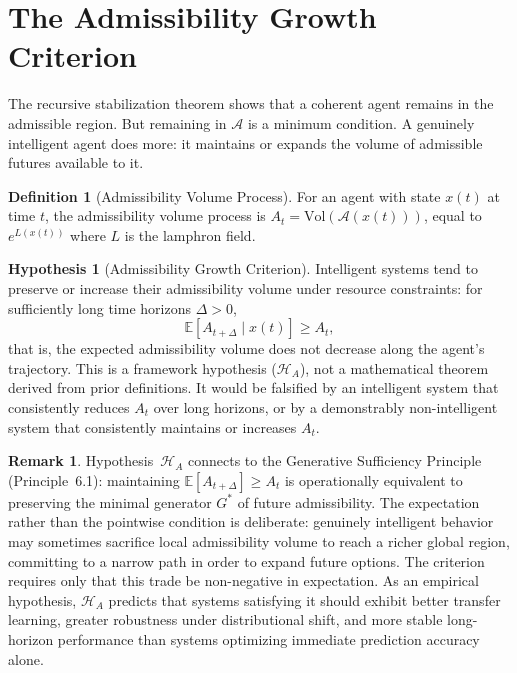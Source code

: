 \documentclass[12pt, oneside]{book}
\theoremstyle{flyxion}
\theoremstyle{definition}
\newtheorem{definition}[theorem]{Definition}
\newtheorem{hypothesis}[theorem]{Hypothesis}
\newtheorem{remark}[theorem]{Remark}
\begin{document}
\section{The Admissibility Growth Criterion}

The recursive stabilization theorem shows that a
coherent agent remains in the admissible region. But
remaining in $\mathcal{A}$ is a minimum condition.
A genuinely intelligent agent does more: it maintains
or expands the volume of admissible futures available
to it.

\begin{definition}[Admissibility Volume Process]
For an agent with state $x(t)$ at time $t$, the
admissibility volume process is $A_t =
\mathrm{Vol}(\mathcal{A}(x(t)))$, equal to $e^{L(x(t))}$
where $L$ is the lamphron field.
\end{definition}

\begin{hypothesis}[Admissibility Growth Criterion]
\label{thm:intelligence_criterion}
Intelligent systems tend to preserve or increase their
admissibility volume under resource constraints: for
sufficiently long time horizons $\Delta > 0$,
\[
\mathbb{E}[A_{t+\Delta} \mid x(t)] \geq A_t,
\]
that is, the expected admissibility volume does not
decrease along the agent's trajectory. This is a
framework hypothesis ($\mathcal{H}_A$), not a
mathematical theorem derived from prior definitions.
It would be falsified by an intelligent system that
consistently reduces $A_t$ over long horizons, or by
a demonstrably non-intelligent system that consistently
maintains or increases $A_t$.
\end{hypothesis}

\begin{remark}
Hypothesis~$\mathcal{H}_A$ connects to the Generative
Sufficiency Principle (Principle~6.1): maintaining
$\mathbb{E}[A_{t+\Delta}] \geq A_t$ is operationally
equivalent to preserving the minimal generator $G^*$
of future admissibility. The expectation rather than
the pointwise condition is deliberate: genuinely
intelligent behavior may sometimes sacrifice local
admissibility volume to reach a richer global region,
committing to a narrow path in order to expand future
options. The criterion requires only that this trade
be non-negative in expectation. As an empirical
hypothesis, $\mathcal{H}_A$ predicts that systems
satisfying it should exhibit better transfer learning,
greater robustness under distributional shift, and
more stable long-horizon performance than systems
optimizing immediate prediction accuracy alone.
\end{remark}
\end{document}
